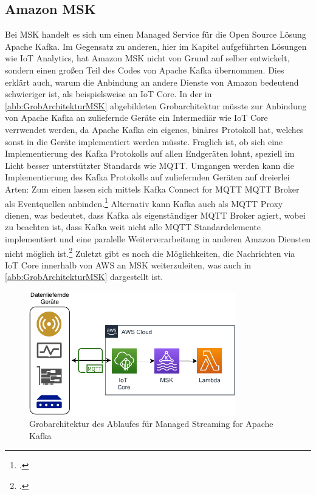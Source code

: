 \subsection{Amazon MSK}
Bei \ac{MSK} handelt es sich um einen Managed Service für die Open Source Lösung Apache Kafka. Im Gegensatz zu anderen, hier im Kapitel aufgeführten Lösungen wie \ac{IoT} Analytics, hat Amazon \ac{MSK} nicht von Grund auf selber entwickelt, sondern einen großen Teil des Codes von Apache Kafka übernommen. Dies erklärt auch, warum die Anbindung an andere Dienste von Amazon bedeutend schwieriger ist, als beispielsweise an \ac{IoT} Core. In der in \autoref{abb:GrobArchitekturMSK} abgebildeten Grobarchitektur müsste zur Anbindung von Apache Kafka an zuliefernde Geräte ein Intermediär wie \ac{IoT} Core verrwendet werden, da Apache Kafka ein eigenes, binäres Protokoll hat, welches sonst in die Geräte implementiert werden müsste.  Fraglich ist, ob sich eine Implementierung des Kafka Protokolls auf allen Endgeräten lohnt, speziell im Licht besser unterstützter Standards wie \ac{MQTT}. Umgangen werden kann die Implementierung des Kafka Protokolls auf zuliefernden Geräten auf dreierlei Arten: Zum einen lassen sich mittels Kafka Connect for \ac{MQTT} \ac{MQTT} Broker als Eventquellen anbinden.\footcite[Vgl.][]{Erber.12.01.2021} Alternativ kann Kafka auch als \ac{MQTT} Proxy dienen, was bedeutet, dass Kafka als eigenständiger MQTT Broker agiert, wobei zu beachten ist, dass Kafka weit nicht alle \ac{MQTT} Standardelemente implementiert und eine paralelle Weiterverarbeitung in anderen Amazon Diensten nicht möglich ist.\footcite[Vgl.][]{Erber.12.01.2021} Zuletzt gibt es noch die Möglichkeiten, die Nachrichten via \ac{IoT} Core innerhalb von \ac{AWS} an \ac{MSK} weiterzuleiten, was auch in \autoref{abb:GrobArchitekturMSK} dargestellt ist.
\begin{figure}[H]
\centering
\includegraphics[width=0.8\textwidth]{graphics/MSK-general.pdf}
\caption{Grobarchitektur des Ablaufes für Managed Streaming for Apache Kafka}
\label{abb:GrobArchitekturMSK}
\end{figure}

